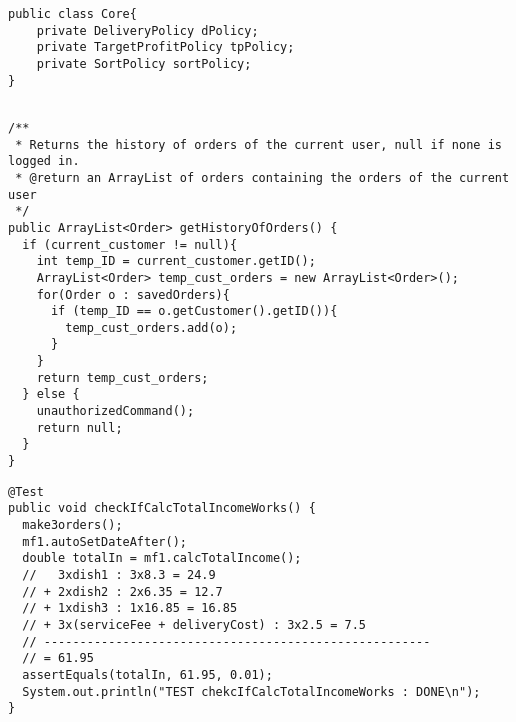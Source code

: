 \begin{lstlisting}[caption=Aggregation applied to the \Core~and its policies.,
  label=lst:aggregationCore]
public class Core{
    private DeliveryPolicy dPolicy;
    private TargetProfitPolicy tpPolicy;
    private SortPolicy sortPolicy;
}
  
\end{lstlisting}


\begin{lstlisting}[caption=Application of the \texttt{current\_customer}
  concept to \texttt{getHistoryOfOrders}.,
  label=lst:historyOfOrders]
/**
 * Returns the history of orders of the current user, null if none is logged in.
 * @return an ArrayList of orders containing the orders of the current user
 */
public ArrayList<Order> getHistoryOfOrders() {
  if (current_customer != null){
    int temp_ID = current_customer.getID();
    ArrayList<Order> temp_cust_orders = new ArrayList<Order>();
    for(Order o : savedOrders){
      if (temp_ID == o.getCustomer().getID()){
        temp_cust_orders.add(o);
      }
    }
    return temp_cust_orders;
  } else {
    unauthorizedCommand();
    return null;
  }
}
\end{lstlisting}

\begin{lstlisting}[caption=Example of a test using \texttt{assertEquals} with 2 decimal precision.,
  label=lst:test_total_income]
@Test
public void checkIfCalcTotalIncomeWorks() {
  make3orders();
  mf1.autoSetDateAfter();
  double totalIn = mf1.calcTotalIncome();
  //   3xdish1 : 3x8.3 = 24.9
  // + 2xdish2 : 2x6.35 = 12.7
  // + 1xdish3 : 1x16.85 = 16.85
  // + 3x(serviceFee + deliveryCost) : 3x2.5 = 7.5
  // ------------------------------------------------------
  // = 61.95
  assertEquals(totalIn, 61.95, 0.01);
  System.out.println("TEST chekcIfCalcTotalIncomeWorks : DONE\n");
}
\end{lstlisting}


